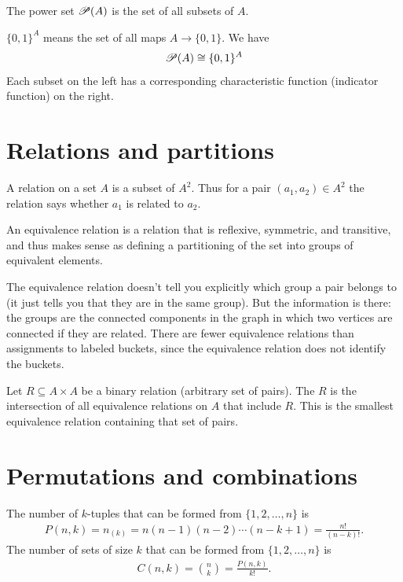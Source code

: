 \begin{definition}
The power set $\mathscr{P}(A)$ is the set of all subsets of $A$.

$\{0, 1\}^A$ means the set of all maps $A \to \{0, 1\}$. We have
\begin{align*}
  \mathscr{P}(A) \cong \{0, 1\}^A
\end{align*}
Each subset on the left has a corresponding characteristic function (indicator function) on the right.
\end{definition}


\section{Relations and partitions}
A relation on a set $A$ is a subset of $A^2$. Thus for a pair
$(a_1, a_2) \in A^2$ the relation says whether $a_1$ is related to $a_2$.

An equivalence relation is a relation that is reflexive, symmetric, and
transitive, and thus makes sense as defining a partitioning of the set into
groups of equivalent elements.

The equivalence relation doesn't tell you explicitly which group a pair belongs
to (it just tells you that they are in the same group). But the information is
there: the groups are the connected components in the graph in which two
vertices are connected if they are related. There are fewer equivalence
relations than assignments to labeled buckets, since the equivalence relation
does not identify the buckets. 

\begin{definition}
  Let $R \subseteq A \times A$ be a binary relation (arbitrary set of pairs). The 
  $R$ is the intersection of all equivalence relations on $A$ that include $R$. This is the smallest
  equivalence relation containing that set of pairs.
\end{definition}




\section{Permutations and combinations}

\begin{theorem*}
  The number of $k$-tuples that can be formed from $\{1, 2, \ldots, n\}$ is
  \begin{align*}
    P(n, k) = n_{(k)} = n(n-1)(n-2)\cdots(n-k+1) = \frac{n!}{(n - k)!}.
  \end{align*}
  The number of sets of size $k$ that can be formed from $\{1, 2, \ldots, n\}$ is
  \begin{align*}
    C(n, k) = {n \choose k} = \frac{P(n, k)}{k!}.
  \end{align*}
\end{theorem*}

